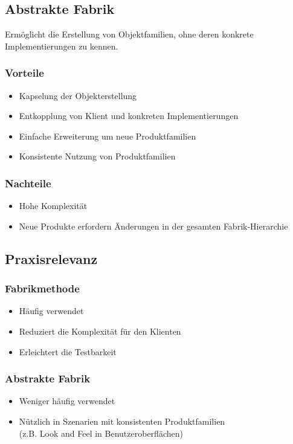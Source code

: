 \documentclass[11pt, a4paper]{article}
\begin{document}
\subsection{Abstrakte Fabrik}

Ermöglicht die Erstellung von Objektfamilien, ohne deren konkrete Implementierungen zu kennen.

\subsubsection*{Vorteile}
\begin{itemize}
    \item Kapselung der Objekterstellung
    \item Entkopplung von Klient und konkreten Implementierungen
    \item Einfache Erweiterung um neue Produktfamilien
    \item Konsistente Nutzung von Produktfamilien
\end{itemize}

\subsubsection*{Nachteile}
\begin{itemize}
    \item Hohe Komplexität
    \item Neue Produkte erfordern Änderungen in der gesamten Fabrik-Hierarchie
\end{itemize}


\subsection{Praxisrelevanz}

\vspace{1em}

\begin{minipage}[h]{0.45\textwidth}
    \subsubsection*{Fabrikmethode}
    \begin{itemize}
        \item Häufig verwendet
        \item Reduziert die Komplexität für den Klienten
        \item Erleichtert die Testbarkeit
    \end{itemize}
\end{minipage}
\begin{minipage}[h]{0.45\textwidth}
    \subsubsection*{Abstrakte Fabrik}
    \begin{itemize}
        \item Weniger häufig verwendet
        \item Nützlich in Szenarien mit konsistenten Produktfamilien \\ (z.B. Look and Feel in Benutzeroberflächen)
    \end{itemize}
\end{minipage}
\end{document}
